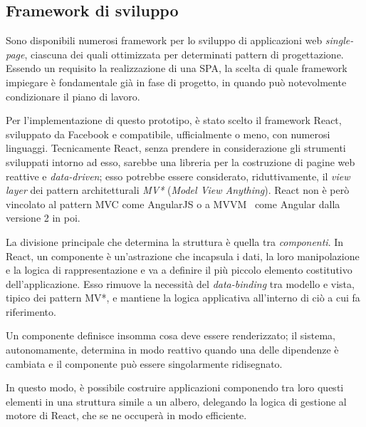     \subsection{Framework di sviluppo}\label{subsec:react}

      Sono disponibili numerosi framework per lo sviluppo di applicazioni web \emph{single-page}, ciascuna dei quali ottimizzata per determinati pattern di progettazione.
      Essendo un requisito la realizzazione di una SPA, la scelta di quale framework impiegare è fondamentale già in fase di progetto, in quando può notevolmente condizionare il piano di lavoro.

      Per l'implementazione di questo prototipo, è stato scelto il framework React, sviluppato da Facebook e compatibile, ufficialmente o meno, con numerosi linguaggi.
      Tecnicamente React, senza prendere in considerazione gli strumenti sviluppati intorno ad esso, sarebbe una libreria per la costruzione di pagine web reattive e \emph{data-driven};
      esso potrebbe essere considerato, riduttivamente, il \emph{view layer} dei pattern architetturali \emph{MV*} (\emph{Model View Anything}).
      React non è però vincolato al pattern MVC come AngularJS o a MVVM~\cite{Anderson2012} come Angular dalla versione 2 in poi.


      La divisione principale che determina la struttura è quella tra \emph{componenti}.
      In React, un componente è un'astrazione che incapsula i dati, la loro manipolazione e la logica di rappresentazione e va a definire il più piccolo elemento costitutivo dell'applicazione.
      Esso rimuove la necessità del \emph{data-binding} tra modello e vista, tipico dei pattern MV*, e mantiene la logica applicativa all'interno di ciò a cui fa riferimento.

      Un componente definisce insomma cosa deve essere renderizzato;
      il sistema, autonomamente, determina in modo reattivo quando una delle dipendenze è cambiata e il componente può essere singolarmente ridisegnato.

      In questo modo, è possibile costruire applicazioni componendo tra loro questi elementi in una struttura simile a un albero, delegando la logica di gestione al motore di React, che se ne occuperà in modo efficiente.

